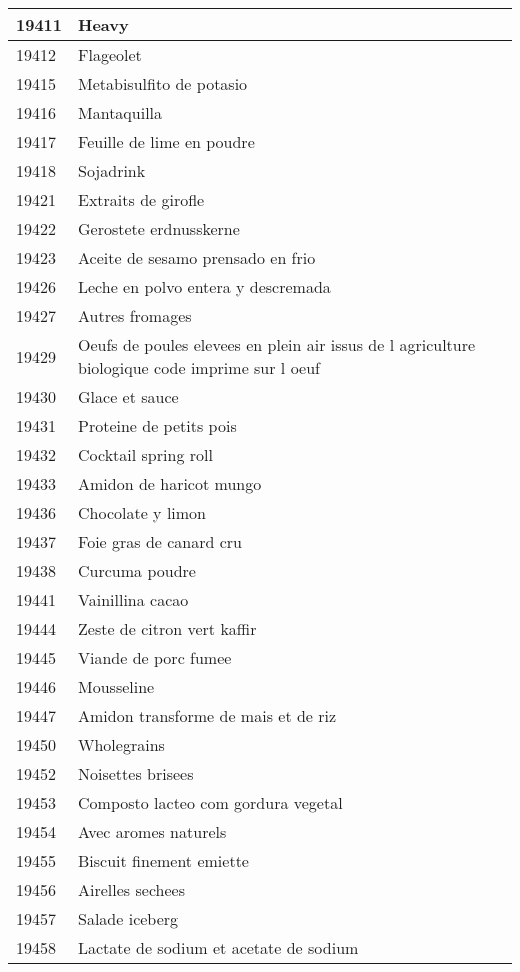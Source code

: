 \begin{longtable}{|l|l|}
19411 & Heavy \\ \hline 
19412 & Flageolet \\ \hline 
19415 & Metabisulfito de potasio \\ \hline 
19416 & Mantaquilla \\ \hline 
19417 & Feuille de lime en poudre \\ \hline 
19418 & Sojadrink \\ \hline 
19421 & Extraits de girofle \\ \hline 
19422 & Gerostete erdnusskerne \\ \hline 
19423 & Aceite de sesamo prensado en frio \\ \hline 
19426 & Leche en polvo entera y descremada \\ \hline 
19427 & Autres fromages \\ \hline 
19429 & Oeufs de poules elevees en plein air issus de l agriculture biologique code imprime sur l oeuf \\ \hline 
19430 & Glace et sauce \\ \hline 
19431 & Proteine de petits pois \\ \hline 
19432 & Cocktail spring roll \\ \hline 
19433 & Amidon de haricot mungo \\ \hline 
19436 & Chocolate y limon \\ \hline 
19437 & Foie gras de canard cru \\ \hline 
19438 & Curcuma poudre \\ \hline 
19441 & Vainillina cacao \\ \hline 
19444 & Zeste de citron vert kaffir \\ \hline 
19445 & Viande de porc fumee \\ \hline 
19446 & Mousseline \\ \hline 
19447 & Amidon transforme de mais et de riz \\ \hline 
19450 & Wholegrains \\ \hline 
19452 & Noisettes brisees \\ \hline 
19453 & Composto lacteo com gordura vegetal \\ \hline 
19454 & Avec aromes naturels \\ \hline 
19455 & Biscuit finement emiette \\ \hline 
19456 & Airelles sechees \\ \hline 
19457 & Salade iceberg \\ \hline 
19458 & Lactate de sodium et acetate de sodium \\ \hline 

\end{longtable}
